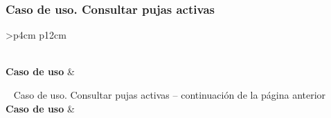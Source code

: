 \subsubsection{Caso de uso. Consultar pujas activas} \label{sec:cu_consultar-pujas}
\begin{longtable}{
    >{}p{4cm}
    p{12cm}
    }
    \caption{Caso de uso. Consultar pujas activas} \label{table:cu_consultar-puja} \\
    \toprule
    \textbf{Caso de uso} &  \\
    \endfirsthead
    
    {{ \tablename\ \thetable{} Caso de uso. Consultar pujas activas -- continuación de la página anterior}} \\
    \toprule
    \textbf{Caso de uso} &  \\
    \midrule
    \endhead
    
    \midrule
     \\ 
    \endfoot
    
    \bottomrule
    \endlastfoot
    

\end{longtable}
